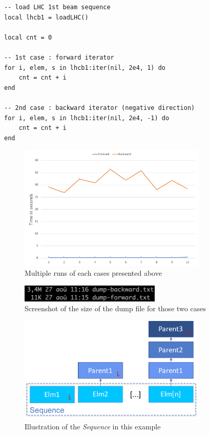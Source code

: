 \begin{lstlisting}[style=LuaStyle]
-- load LHC 1st beam sequence
local lhcb1 = loadLHC()

local cnt = 0

-- 1st case : forward iterator
for i, elem, s in lhcb1:iter(nil, 2e4, 1) do
	cnt = cnt + i
end

-- 2nd case : backward iterator (negative direction)
for i, elem, s in lhcb1:iter(nil, 2e4, -1) do
	cnt = cnt + i
end
\end{lstlisting}

\begin{figure}[H]
    \centering
    \includegraphics[width=0.8\textwidth]{./Images/seq-iter-curve.pdf}
    \caption{Multiple runs of each cases presented above}
    \label{fig:MO-seq-iter-curve}
\end{figure}

\begin{figure}[H]
    \centering
    \includegraphics[width=0.6\textwidth]{./Images/dump-size}
    \caption{Screenshot of the size of the dump file for those two cases}
    \label{fig:MO-seq-iter}
\end{figure}

\begin{figure}[H]
    \centering
    \includegraphics[width=0.8\textwidth]{./Images/seq-iter-schematic.pdf}
    \caption{Illustration of the \emph{Sequence} in this example}
    \label{fig:MO-seq-iter-schematic}
\end{figure}

